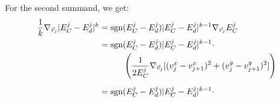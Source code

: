\begin{proposition}
	For the second summand, we get:
	\begin{align*}
		\frac{1}{k} \nabla_{\vec{v}_{j}} |E^{j}_{C} - E^{j}_d|^k 
		&= \sgn(E^{j}_C - E^{j}_d) |E^{j}_C - E^{j}_d|^{k-1} \nabla_{\vec{v}_j} E^{j}_C \\
		&= \sgn(E^{j}_C - E^{j}_d) |E^{j}_C - E^{j}_d|^{k-1} \cdot   \\
		& \hspace{1cm} \left(\frac{1}{2 E^{j}_C} \nabla_{\vec{v}_j} [(v_{j}^{x} - v_{j+1}^{x})^2 + (v_{j}^{y} - v_{j+1}^{y})^2]\right) \\[0.5em] 
		&= \sgn(E^{j}_C - E^{j}_d) |E^{j}_C - E^{j}_d|^{k-1} \cdot   \\

\end{align*}
\end{proposition}
